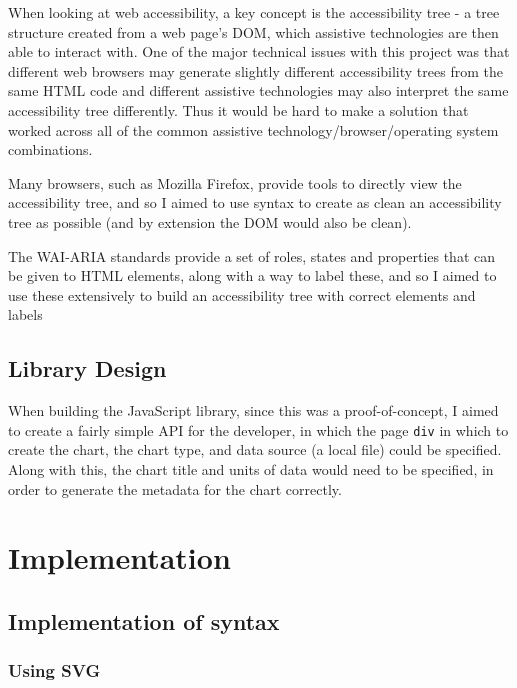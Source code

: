 \documentclass[ %
                    author={Aleena Baig},
                supervisor={Dr Simon Lock},
                    degree={BSc},
                     title={On Making Web Accessible Graphs},
                  subtitle={},
                      year={2019} ]{dissertation}
\begin{document}
When looking at web accessibility, a key concept is the accessibility tree - a tree structure created from a web page's DOM, which assistive technologies are then able to interact with. One of the major technical issues with this project was that different web browsers may generate slightly different accessibility trees from the same HTML code and different assistive technologies may also interpret the same accessibility tree differently. Thus it would be hard to make a solution that worked across all of the common assistive technology/browser/operating system combinations.


Many browsers, such as Mozilla Firefox, provide tools to directly view the accessibility tree, and so I aimed to use syntax to create as clean an accessibility tree as possible (and by extension the DOM would also be clean).

The WAI-ARIA standards provide a set of roles, states and properties that can be given to HTML elements, along with a way to label these, and so I aimed to use these extensively to build an accessibility tree with correct elements and labels

\section{Library Design}

When building the JavaScript library, since this was a proof-of-concept, I aimed to create a fairly simple API for the developer, in which the page \texttt{div} in which to create the chart, the chart type, and data source (a local file) could be specified. Along with this, the chart title and units of data would need to be specified, in order to generate the metadata for the chart correctly.


\chapter{Implementation}

\section{Implementation of syntax}

\subsection{Using SVG}
\end{document}
